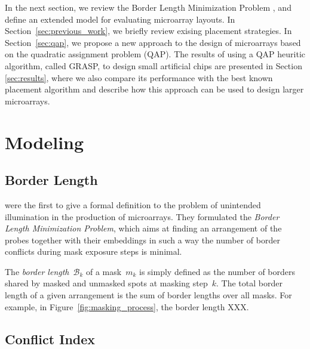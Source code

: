 \documentclass{bioinfo}
\begin{document}
In the next section, we review the Border Length Minimization Problem \citep{HANNENHALLI02}, and define an extended model for evaluating microarray layouts. In Section~\ref{sec:previous_work}, we briefly review exising placement strategies. In Section~\ref{sec:qap}, we propose a new approach to the design of microarrays based on the quadratic assignment problem (QAP). The results of using a QAP heuritic algorithm, called GRASP, to design small artificial chips are presented in Section \ref{sec:results}, where we also compare its performance with the best known placement algorithm and describe how this approach can be used to design larger microarrays.

\section{Modeling}
\label{sec:modelling}

\subsection{Border Length}

\citet{HANNENHALLI02} were the first to give a formal definition to the problem of unintended illumination in the production of microarrays. They formulated the \emph{Border Length Minimization Problem}, which aims at finding an arrangement of the probes together with their embeddings in such a way the number of border conflicts during mask exposure steps is minimal.

The \emph{border length}~$\mathcal{B}_k$ of a mask~$m_{k}$ is simply
defined as the number of borders shared by masked and unmasked spots
at masking step~$k$. The total border length of a given arrangement is
the sum of border lengths over all masks. For example, in
Figure~\ref{fig:masking_process}, the border length XXX.

\subsection{Conflict Index}
\end{document}
